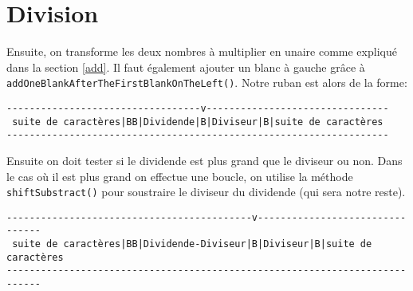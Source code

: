 \documentclass[a4paper,11pt]{article}
\begin{document}
\section{Division}
Ensuite, on transforme les deux nombres à multiplier en unaire comme expliqué dans la section \ref{add}. Il faut également ajouter un blanc à gauche grâce à \texttt{addOneBlankAfterTheFirstBlankOnTheLeft()}.
Notre ruban est alors de la forme:
\begin{small}
\begin{verbatim}
----------------------------------v--------------------------------
 suite de caractères|BB|Dividende|B|Diviseur|B|suite de caractères
-------------------------------------------------------------------
\end{verbatim}
\end{small}
Ensuite on doit tester si le dividende est plus grand que le diviseur ou non. 
Dans le cas où il est plus grand on effectue une boucle, on utilise la méthode \texttt{shiftSubstract()} pour soustraire le diviseur du dividende (qui sera notre reste).
\begin{small}
\begin{verbatim}
-------------------------------------------v--------------------------------
 suite de caractères|BB|Dividende-Diviseur|B|Diviseur|B|suite de caractères
----------------------------------------------------------------------------
\end{verbatim}
\end{small}
\end{document}
